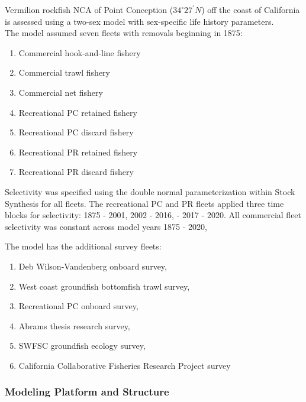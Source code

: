 \documentclass[11pt,
  english,
  a4paper,
]{article}
\begin{document}
Vermilion rockfish NCA of Point Conception ($34^\circ 27^\prime N$) off the coast of California is assessed using a two-sex model with sex-specific life history parameters.\\
The model assumed seven fleets with removals beginning in 1875:

\begin{enumerate}
  \item Commercial hook-and-line fishery
  \item Commercial trawl fishery
  \item Commercial net fishery
  \item Recreational PC retained fishery
  \item Recreational PC discard fishery
  \item Recreational PR retained fishery
  \item Recreational PR discard fishery
\end{enumerate}

Selectivity was specified using the double normal parameterization within Stock Synthesis for all fleets. The recreational PC and PR fleets applied three time blocks for selectivity: 1875 - 2001, 2002 - 2016, - 2017 - 2020. All commercial fleet selectivity was constant across model years 1875 - 2020,

The model has the additional survey fleets:

\begin{enumerate}
 \item Deb Wilson-Vandenberg onboard survey,
 \item West coast groundfish bottomfish trawl survey,
 \item Recreational PC onboard survey,
 \item Abrams thesis research survey,
 \item SWFSC groundfish ecology survey,
 \item California Collaborative Fisheries Research Project survey
\end{enumerate}


\hypertarget{modeling-platform-and-structure}{%
\subsubsection{Modeling Platform and Structure}\label{modeling-platform-and-structure}}

\leavevmode\tagmcend\tagstructend
\end{document}

